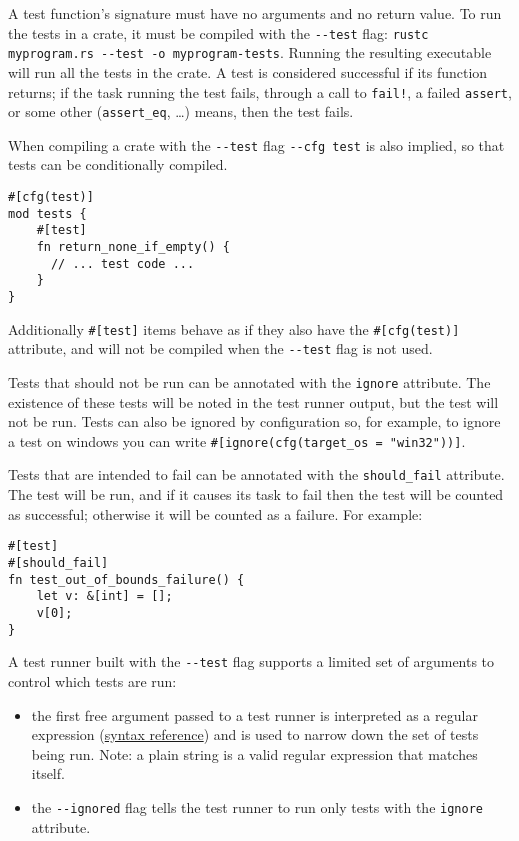 \documentclass[]{article}
\begin{document}
A test function's signature must have no arguments and no return value.
To run the tests in a crate, it must be compiled with the
\texttt{-\/-test} flag:
\texttt{rustc myprogram.rs -\/-test -o myprogram-tests}. Running the
resulting executable will run all the tests in the crate. A test is
considered successful if its function returns; if the task running the
test fails, through a call to \texttt{fail!}, a failed \texttt{assert},
or some other (\texttt{assert\_eq}, \ldots{}) means, then the test
fails.

When compiling a crate with the \texttt{-\/-test} flag
\texttt{-\/-cfg test} is also implied, so that tests can be
conditionally compiled.

\begin{verbatim}
#[cfg(test)]
mod tests {
    #[test]
    fn return_none_if_empty() {
      // ... test code ...
    }
}
\end{verbatim}

Additionally \texttt{\#{[}test{]}} items behave as if they also have the
\texttt{\#{[}cfg(test){]}} attribute, and will not be compiled when the
\texttt{-\/-test} flag is not used.

Tests that should not be run can be annotated with the \texttt{ignore}
attribute. The existence of these tests will be noted in the test runner
output, but the test will not be run. Tests can also be ignored by
configuration so, for example, to ignore a test on windows you can write
\texttt{\#{[}ignore(cfg(target\_os = "win32")){]}}.

Tests that are intended to fail can be annotated with the
\texttt{should\_fail} attribute. The test will be run, and if it causes
its task to fail then the test will be counted as successful; otherwise
it will be counted as a failure. For example:

\begin{verbatim}
#[test]
#[should_fail]
fn test_out_of_bounds_failure() {
    let v: &[int] = [];
    v[0];
}
\end{verbatim}

A test runner built with the \texttt{-\/-test} flag supports a limited
set of arguments to control which tests are run:

\begin{itemize}
\itemsep1pt\parskip0pt
\item
  the first free argument passed to a test runner is interpreted as a
  regular expression (\href{regex/index.html\#syntax}{syntax reference})
  and is used to narrow down the set of tests being run. Note: a plain
  string is a valid regular expression that matches itself.
\item
  the \texttt{-\/-ignored} flag tells the test runner to run only tests
  with the \texttt{ignore} attribute.
\end{itemize}
\end{document}
